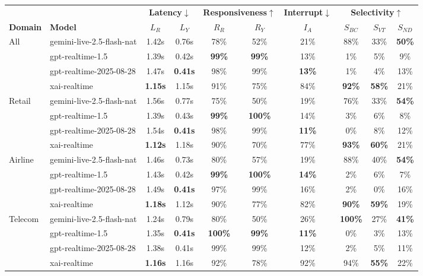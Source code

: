 \begin{tabular}{@{}ll|cc|cc|c|ccc@{}}
\toprule
 & & \multicolumn{2}{c|}{\textbf{Latency}$\downarrow$} & \multicolumn{2}{c|}{\textbf{Responsiveness}$\uparrow$} & \textbf{Interrupt}$\downarrow$ & \multicolumn{3}{c}{\textbf{Selectivity}$\uparrow$} \\
\textbf{Domain} & \textbf{Model} & $L_R$ & $L_Y$ & $R_R$ & $R_Y$ & $I_A$ & $S_{BC}$ & $S_{VT}$ & $S_{ND}$ \\
\midrule
\multirow{4}{*}{All} & gemini-live-2.5-flash-nat & 1.42s & 0.76s & 78\% & 52\% & 21\% & 88\% & 33\% & \textbf{50\%} \\
 & gpt-realtime-1.5 & 1.39s & 0.42s & \textbf{99\%} & \textbf{99\%} & 13\% & 1\% & 5\% & 9\% \\
 & gpt-realtime-2025-08-28 & 1.47s & \textbf{0.41s} & 98\% & 99\% & \textbf{13\%} & 1\% & 4\% & 13\% \\
 & xai-realtime & \textbf{1.15s} & 1.15s & 91\% & 75\% & 84\% & \textbf{92\%} & \textbf{58\%} & 21\% \\
\midrule
\multirow{4}{*}{Retail} & gemini-live-2.5-flash-nat & 1.56s & 0.77s & 75\% & 50\% & 19\% & 76\% & 33\% & \textbf{54\%} \\
 & gpt-realtime-1.5 & 1.39s & 0.43s & \textbf{99\%} & \textbf{100\%} & 14\% & 3\% & 6\% & 8\% \\
 & gpt-realtime-2025-08-28 & 1.54s & \textbf{0.41s} & 98\% & 99\% & \textbf{11\%} & 0\% & 8\% & 12\% \\
 & xai-realtime & \textbf{1.12s} & 1.18s & 90\% & 70\% & 77\% & \textbf{93\%} & \textbf{60\%} & 21\% \\
\midrule
\multirow{4}{*}{Airline} & gemini-live-2.5-flash-nat & 1.46s & 0.73s & 80\% & 57\% & 19\% & 88\% & 40\% & \textbf{54\%} \\
 & gpt-realtime-1.5 & 1.43s & 0.42s & \textbf{99\%} & \textbf{100\%} & \textbf{14\%} & 2\% & 6\% & 7\% \\
 & gpt-realtime-2025-08-28 & 1.49s & \textbf{0.41s} & 97\% & 99\% & 16\% & 2\% & 0\% & 16\% \\
 & xai-realtime & \textbf{1.18s} & 1.12s & 90\% & 77\% & 82\% & \textbf{90\%} & \textbf{59\%} & 19\% \\
\midrule
\multirow{4}{*}{Telecom} & gemini-live-2.5-flash-nat & 1.24s & 0.79s & 80\% & 50\% & 26\% & \textbf{100\%} & 27\% & \textbf{41\%} \\
 & gpt-realtime-1.5 & 1.35s & \textbf{0.41s} & \textbf{100\%} & \textbf{99\%} & \textbf{11\%} & 0\% & 3\% & 13\% \\
 & gpt-realtime-2025-08-28 & 1.38s & 0.41s & 99\% & 99\% & 12\% & 2\% & 5\% & 11\% \\
 & xai-realtime & \textbf{1.16s} & 1.16s & 92\% & 78\% & 92\% & 94\% & \textbf{55\%} & 22\% \\
\bottomrule
\end{tabular}